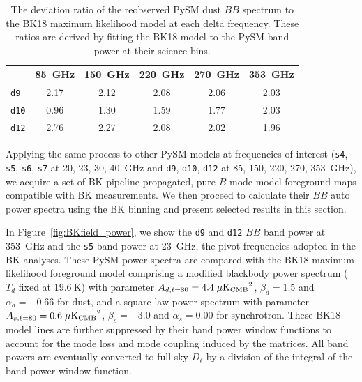 \documentclass[twocolumn]{aastex631}
\begin{document}
\begin{table}
    \centering
    \begin{tabular}{lccccc}
    \toprule 
     & 85~GHz & 150~GHz & 220~GHz & 270~GHz & 353~GHz \\
    \midrule
    \texttt{d9}  & 2.17 & 2.12 & 2.08 & 2.06 & 2.03 \\
    \texttt{d10} & 0.96 & 1.30 & 1.59 & 1.77 & 2.03 \\
    \texttt{d12} & 2.76	& 2.27 & 2.08 & 2.02 & 1.96 \\
   \bottomrule
    \end{tabular}
    \caption{The deviation ratio of the reobserved PySM dust $BB$ spectrum to the BK18 maximum likelihood model at each delta frequency. These ratios are derived by fitting the BK18 model to the PySM band power at their science bins.}
    \label{tab:BB_dustratio}
\end{table}

Applying the same process to other PySM models at frequencies of interest (\texttt{s4}, \texttt{s5}, \texttt{s6}, \texttt{s7} at 20, 23, 30, 40~GHz and \texttt{d9}, \texttt{d10}, \texttt{d12} at 85, 150, 220, 270, 353~GHz), we acquire a set of BK pipeline propagated, pure $B$-mode model foreground maps compatible with BK measurements. We then proceed to calculate their $BB$ auto power spectra using the BK binning and present selected results in this section. 

In Figure~\ref{fig:BKfield_power}, we show the \texttt{d9} and \texttt{d12} $BB$ band power at 353~GHz and the \texttt{s5} band power at 23~GHz, the pivot frequencies adopted in the BK analyses. These PySM power spectra are compared with the BK18 maximum likelihood foreground model comprising a modified blackbody power spectrum ($T_d$ fixed at $19.6~\text{K}$) with parameter $A_{d,\ell=80} = 4.4 \; \mu\rm{K_{CMB}}^2$, $\beta_d = 1.5$ and $\alpha_d = -0.66$ for dust, and a square-law power spectrum with parameter $A_{s,\ell=80} = 0.6 \; \mu\rm{K_{CMB}}^2$, $\beta_s = -3.0$ and $\alpha_s = 0.00$ for synchrotron. These BK18 model lines are further suppressed by their band power window functions to account for the mode loss and mode coupling induced by the matrices. All band powers are eventually converted to full-sky $D_\ell$ by a division of the integral of the band power window function. 
\end{document}
